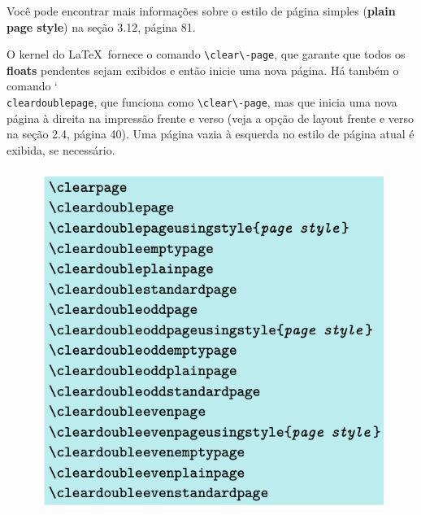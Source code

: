 Você pode encontrar mais informações sobre o estilo de página simples (\textbf{plain page style}) na seção 3.12, página 81.

O kernel do \LaTeX\ fornece o comando \verb|\clear\-page|, que garante que todos os \textbf{floats} pendentes sejam exibidos e então inicie uma nova página. Há também o comando \char`\\\texttt{clear\-dou\-ble\-pa\-ge}, que funciona como \verb|\clear\-page|, mas que inicia uma nova página à direita na impressão frente e verso (veja a opção de layout frente e verso na seção 2.4, página 40). Uma página vazia à esquerda no estilo de página atual é exibida, se necessário.

\begin{figure}[hb]
    \centering
    \includegraphics[width=0.75\linewidth]{imagem16.png}
    \label{fig:img16}
\end{figure}


    
